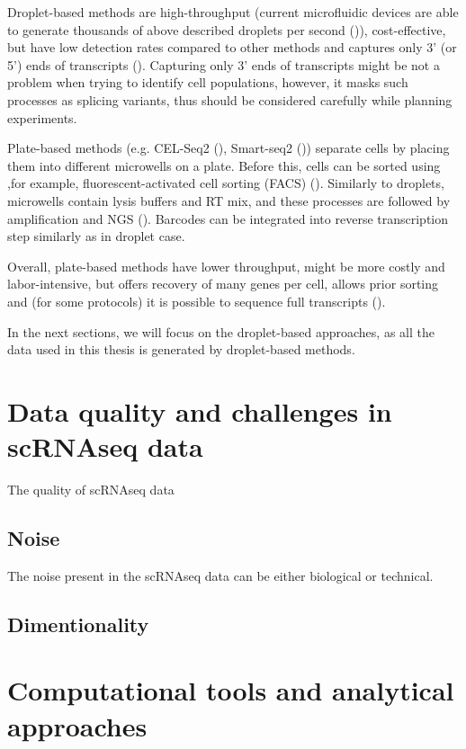 Droplet-based methods are high-throughput
(current microfluidic devices are able to generate thousands of above described droplets per second (\cite{Prakadan2017})),
cost-effective, but have low detection rates compared to other methods and
captures only 3' (or 5') ends of transcripts (\cite{Heumos2023}).
Capturing only 3' ends of transcripts might be not a problem when trying to identify cell populations,
however, it masks such processes as splicing variants, thus should be considered carefully while planning experiments.

Plate-based methods (e.g. CEL-Seq2 (\cite{Hashimshony2016}), Smart-seq2 (\cite{Picelli2013}))
separate cells by placing them into different microwells on a plate.
Before this, cells can be sorted using ,for example, fluorescent-activated cell sorting (FACS) (\cite{Heumos2023}).
Similarly to droplets, microwells contain lysis buffers and RT mix,
and these processes are followed by amplification and NGS (\cite{Hashimshony2016}).
Barcodes can be integrated into reverse transcription step similarly as in droplet case.

Overall, plate-based methods have lower throughput, might be more costly and labor-intensive,
but offers recovery of many genes per cell, allows prior sorting and
(for some protocols) it is possible to sequence full transcripts (\cite{Heumos2023}).

In the next sections, we will focus on the droplet-based approaches,
as all the data used in this thesis is generated by droplet-based methods.

\section{Data quality and challenges in scRNAseq data}

The quality of scRNAseq data

\subsection{Noise}

The noise present in the scRNAseq data can be either biological or technical.

\subsection{Dimentionality}

\section{Computational tools and analytical approaches}


